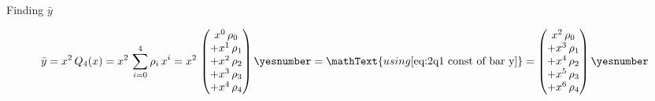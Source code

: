 \documentclass["AM3C-tests_resolutions.tex"]{subfiles}
\begin{document}
\begin{questionBox}
  Finding \(\bar{y}\)
  \begin{tcolorbox}
    \begin{gather*}
      \bar{y}
      = x^2
      \,Q_4(x)
      = x^2
      \,\sum_{i=0}^{4}{
        \rho_i\,x^i
      }
      = x^2
      \,\begin{pmatrix}
        x^0\,\rho_0
        \\+ x^1\,\rho_1
        \\+ x^2\,\rho_2
        \\+ x^3\,\rho_3
        \\+ x^4\,\rho_4
      \end{pmatrix}
      \yesnumber\label{eq:2q1 bar y (const)}
      = \mathText{using \eqref{eq:2q1 const of bar y}}
      = \begin{pmatrix}
        x^2\,\rho_0
        \\+ x^3\,\rho_1
        \\+ x^4\,\rho_2
        \\+ x^5\,\rho_3
        \\+ x^6\,\rho_4
      \end{pmatrix}
      \yesnumber\label{eq:2q1 bar y}
    \end{gather*}
  \end{tcolorbox}


\end{questionBox}
\end{document}
